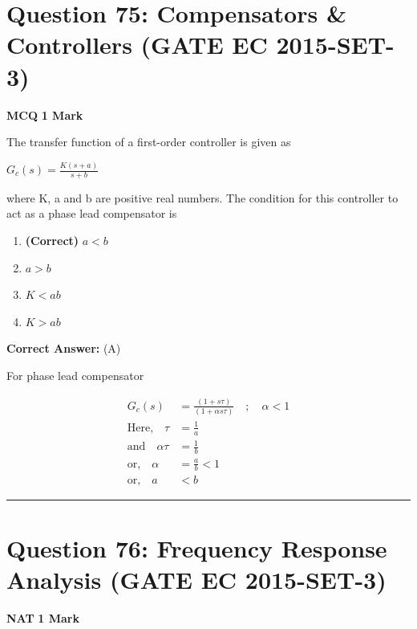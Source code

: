 \documentclass[11pt,a4paper]{article}
\begin{document}
\section*{Question 75: Compensators \& Controllers (GATE EC 2015-SET-3)}
\noindent \textbf{\color{primary}MCQ} \hfill \textbf{\color{secondary}1 Mark}


\noindent The transfer function of a first-order controller is given as 

$G_{c}(s)=\frac{K(s+a)}{s+b}$ 

 where K, a and b are positive real numbers. The condition for this controller to act as a phase lead compensator is


\begin{enumerate}[label=(\Alph*)]
    \item \textbf{(Correct)} $a < b$
    \item $a > b$
    \item $K < ab$
    \item $K > ab$
\end{enumerate}

\noindent \textbf{Correct Answer:} (A)

\begin{tcolorbox}[solbox, title=Detailed Solution -- Question 75]
For phase lead compensator

\[
\begin{aligned} G_{c}(s)&=\frac{(1+s \tau)}{(1+\alpha s \tau)} \quad ; \quad \alpha < 1\\ \text{Here,}\quad \tau&=\frac{1}{a}\\ \text{and}\quad \alpha \tau&=\frac{1}{b}\\ \text{or,}\quad \alpha&=\frac{a}{b} < 1\\ \text{or,}\quad a& < b \end{aligned}
\]
\end{tcolorbox}

\vspace{1.5em}
\hrule
\vspace{1.5em}

\section*{Question 76: Frequency Response Analysis (GATE EC 2015-SET-3)}
\noindent \textbf{\color{primary}NAT} \hfill \textbf{\color{secondary}1 Mark}
\end{document}
